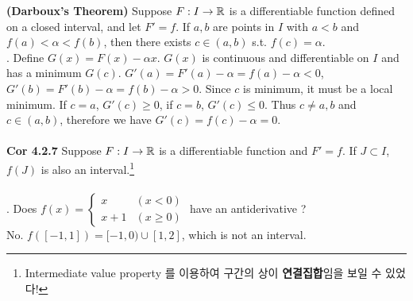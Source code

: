  \textbf{(Darboux's Theorem)} Suppose $F:I\rightarrow\mathbb{R}$ is a differentiable function defined on a closed interval, and let $F'=f$. If $a, b$ are points in $I$ with $a < b$ and $f(a) < \alpha < f(b)$, then there exists $c\in (a, b)$ s.t. $f(c) = \alpha$.\\
\pf. Define $G(x) = F(x) - \alpha x$. $G(x)$ is continuous and differentiable on $I$ and has a minimum $G(c)$. $G'(a) = F'(a) - \alpha = f(a) - \alpha < 0$, $G'(b) = F'(b) - \alpha = f(b) - \alpha > 0$. Since $c$ is minimum, it must be a local minimum. If $c = a$, $G'(c) \geq 0$, if $c = b$, $G'(c) \leq 0$. Thus $c \neq a, b$ and $c \in (a, b)$, therefore we have $G'(c) = f(c) - \alpha = 0$. \\
\\
\textbf{Cor 4.2.7} Suppose $F:I\rightarrow\mathbb{R}$ is a differentiable function and $F'=f$. If $J\subset I$, $f(J)$ is also an interval.\footnote{Intermediate value property 를 이용하여 구간의 상이 \textbf{연결집합}임을 보일 수 있었다!}\\
\\
\ex. Does $f(x) = \begin{cases}
	x & (x < 0) \\ x + 1 & (x \geq 0)
\end{cases}$ have an antiderivative ?\\
No. $f([-1, 1]) = [-1, 0) \cup [1, 2]$, which is not an interval.~\\

